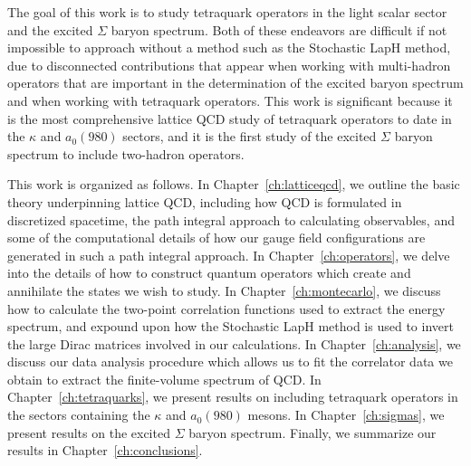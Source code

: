 The goal of this work is to study tetraquark operators in the light scalar sector and the excited $\Sigma$ baryon spectrum. Both of these endeavors are difficult if not impossible to approach without a method such as the Stochastic LapH method, due to disconnected contributions that appear when working with multi-hadron operators that are important in the determination of the excited baryon spectrum and when working with tetraquark operators. This work is significant because it is the most comprehensive lattice QCD study of tetraquark operators to date in the $\kappa$ and $a_0(980)$ sectors, and it is the first study of the excited $\Sigma$ baryon spectrum to include two-hadron operators.

This work is organized as follows. In Chapter~\ref{ch:latticeqcd}, we outline the basic theory underpinning lattice QCD, including how QCD is formulated in discretized spacetime, the path integral approach to calculating observables, and some of the computational details of how our gauge field configurations are generated in such a path integral approach. In Chapter~\ref{ch:operators}, we delve into the details of how to construct quantum operators which create and annihilate the states we wish to study. In Chapter~\ref{ch:montecarlo}, we discuss how to calculate the two-point correlation functions used to extract the energy spectrum, and expound upon how the Stochastic LapH method is used to invert the large Dirac matrices involved in our calculations. In Chapter~\ref{ch:analysis}, we discuss our data analysis procedure which allows us to fit the correlator data we obtain to extract the finite-volume spectrum of QCD. In Chapter~\ref{ch:tetraquarks}, we present results on including tetraquark operators in the sectors containing the $\kappa$ and $a_0(980)$ mesons. In Chapter~\ref{ch:sigmas}, we present results on the excited $\Sigma$ baryon spectrum. Finally, we summarize our results in Chapter~\ref{ch:conclusions}.